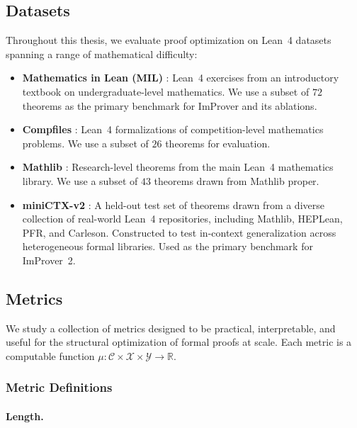 \subsection{Datasets}
\label{sec:datasets}

Throughout this thesis, we evaluate proof optimization on Lean~4 datasets spanning a range of mathematical difficulty:
\begin{itemize}
    \item \textbf{Mathematics in Lean (MIL)} \cite{MIL}: Lean~4 exercises from an introductory textbook on undergraduate-level mathematics. We use a subset of $72$ theorems as the primary benchmark for ImProver and its ablations.
    \item \textbf{Compfiles} \cite{compfiles}: Lean~4 formalizations of competition-level mathematics problems. We use a subset of $26$ theorems for evaluation.
    \item \textbf{Mathlib} \cite{The_mathlib_Community_2020}: Research-level theorems from the main Lean~4 mathematics library. We use a subset of $43$ theorems drawn from Mathlib proper.
    \item \textbf{miniCTX-v2} \cite{miniCTX}: A held-out test set of theorems drawn from a diverse collection of real-world Lean~4 repositories, including Mathlib, HEPLean, PFR, and Carleson. Constructed to test in-context generalization across heterogeneous formal libraries. Used as the primary benchmark for ImProver~2.
\end{itemize}

\subsection{Metrics}
\label{sec:metrics}

We study a collection of metrics designed to be practical, interpretable, and useful for the structural optimization of formal proofs at scale. Each metric is a computable function $\mu : \mathcal{C} \times \mathcal{X} \times \mathcal{Y} \to \mathbb{R}$.

\subsubsection{Metric Definitions}
\label{sssec:metric_defs}

\paragraph{Length.}
\label{def:length}

